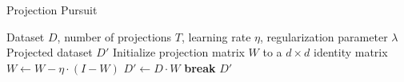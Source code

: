 \documentclass{article}
\begin{document}
	
	\begin{algorithm}
		\caption{Projection Pursuit}
		\begin{algorithmic}[1]
			\Require Dataset $D$, number of projections $T$, learning rate $\eta$, regularization parameter $\lambda$
			\Ensure Projected dataset $D'$
			\State Initialize projection matrix $W$ to a $d \times d$ identity matrix
			\State $W \gets W - \eta \cdot (I - W)$
			\State $D' \gets D \cdot W$
			 \State \textbf{break} \EndIf
			\EndFor
			\State \Return $D'$
		\end{algorithmic}
	\end{algorithm}
	
\end{document}
